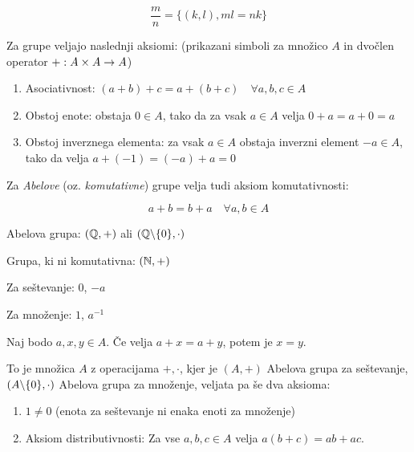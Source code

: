 \[
	\frac{m}{n} = \{(k, l), ml = nk\}
\]


Za grupe veljajo naslednji aksiomi: (prikazani simboli za množico $A$ in dvočlen operator $+: A \times A \rightarrow A$)
\begin{enumerate}
	\item Asociativnost: $(a+b)+c = a+(b+c) \quad \forall a, b, c \in A$
	\item Obstoj enote: obstaja $0 \in A$, tako da za vsak $a \in A$ velja $0+a = a+0 = a$
	\item Obstoj inverznega elementa: za vsak $a \in A$ obstaja inverzni element $-a \in A$, tako da velja $a + (-1) = (-a) + a = 0$
\end{enumerate}

Za \textit{Abelove} (oz. \textit{komutativne}) grupe velja tudi aksiom komutativnosti:

\[
	a + b = b + a \quad \forall a, b \in A
\]


Abelova grupa: $(\mathbb{Q}, +)$ ali $(\mathbb{Q} \backslash \{0\}, \cdot)$

Grupa, ki ni komutativna: $(\mathbb{N}, +)$


Za seštevanje: $0$, $-a$

Za množenje: $1$, $a^{-1}$


Naj bodo $a, x, y \in A$. Če velja $a + x = a + y$, potem je $x=y$.


To je množica $A$ z operacijama $+, \cdot$, kjer je $(A, +)$ Abelova grupa za seštevanje, $(A \backslash \{0\}, \cdot)$ Abelova grupa za množenje, veljata pa še dva aksioma:

\begin{enumerate}
	\item $1 \ne 0$ (enota za seštevanje ni enaka enoti za množenje)
	\item Aksiom distributivnosti: Za vse $a, b, c \in A$ velja $a(b+c) = ab+ac$.
\end{enumerate}

